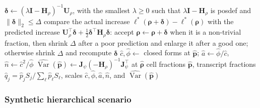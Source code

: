 \documentclass[pdflatex, sn-nature]{sn-jnl}
\theoremstyle{thmstyleone}%
\theoremstyle{thmstyletwo}%
\theoremstyle{thmstylethree}%
\begin{document}
\begin{algorithm}[ht]
\begin{algorithmic}[1]
      \State \(\boldsymbol{\delta}\gets(\lambda\mathbf{I}-\boldsymbol{H}_{\rho})^{-1}\boldsymbol{U}_{\rho}\), with the smallest \(\lambda\ge0\) such that
        \(\lambda\mathbf{I}-\boldsymbol{H}_{\rho}\) is \gls{posdef} and \(\lVert\boldsymbol{\delta}\rVert_{2}\le\Delta\)
      \State compare the actual increase \(\ell^{\ast}(\boldsymbol{\rho}+\boldsymbol{\delta})-\ell^{\ast}(\boldsymbol{\rho})\) with the predicted
        increase \(\boldsymbol{U}_{\rho}^{\top}\boldsymbol{\delta}+\tfrac12\boldsymbol{\delta}^{\top}\boldsymbol{H}_{\rho}\boldsymbol{\delta}\): accept
        \(\boldsymbol{\rho}\gets\boldsymbol{\rho}+\boldsymbol{\delta}\) when it is a non-trivial fraction, then shrink \(\Delta\) after a poor
        prediction and enlarge it after a good one; otherwise shrink \(\Delta\) and recompute \(\boldsymbol{\delta}\)
    \State \(\hat c,\hat\phi\gets\) closed forms at \(\hat{\boldsymbol{p}}\); \(\hat a\gets\hat\phi/\hat c\), \(\hat n\gets\hat c^{2}/\hat\phi\)
    \State \(\widehat{\operatorname{Var}}(\hat{\boldsymbol{p}})\gets\mathbf{J}_{\psi}(-\boldsymbol{H}_{\rho})^{-1}\mathbf{J}_{\psi}^{\top}\) at \(\hat{\boldsymbol{\rho}}\)
    \Ensure cell fractions \(\hat{\boldsymbol{p}}\), transcript fractions \(\hat q_{j}=\hat p_{j}S_{j}/\sum_{\ell}\hat p_{\ell}S_{\ell}\),
      scales \(\hat c,\hat\phi,\hat a,\hat n\), and \(\widehat{\operatorname{Var}}(\hat{\boldsymbol{p}})\)
  \end{algorithmic}
\end{algorithm}

\subsubsection{Synthetic hierarchical scenario}
\label{sec:sc-hierarchical-design}
\end{document}
